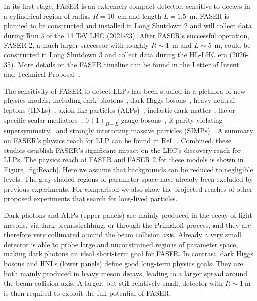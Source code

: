 In its first stage, FASER is an extremely compact detector, sensitive to decays in a cylindrical region of radius $R=10$~cm and length $L= 1.5$~m. FASER is planned to be constructed and installed in Long Shutdown 2 and will collect data during Run 3 of the 14 TeV LHC (2021-23). After FASER's successful operation, FASER 2, a much larger successor with roughly $R\sim1$~m and $L\sim5$~m, could be constructed in Long Shutdown 3 and collect data during the HL-LHC era (2026-35). More details on the FASER timeline can be found in the Letter of Intent~\cite{Ariga:2018zuc} and Technical Proposal~\cite{Ariga:2018pin}.
 
The sensitivity of FASER to detect LLPs has been studied in a plethora of new physics models, including dark photons~\cite{Feng:2017uoz}, dark Higgs bosons~\cite{Feng:2017vli}, heavy neutral leptons (HNLs)~\cite{Kling:2018wct}, axion-like particles (ALPs)~\cite{Feng:2018pew}, inelastic dark matter~\cite{Berlin:2018jbm},
flavor-specific scalar mediators~\cite{Batell:2017kty}, $U(1)_{B-L}$-gauge bosons~\cite{Bauer:2018onh}, R-parity violating supersymmetry~\cite{Helo:2018qej,Dercks:2018eua} and strongly interacting massive particles (SIMPs)~\cite{Hochberg:2018rjs}. A summary on FASER's physics reach for LLP can be found in Ref.~\cite{Ariga:2018uku}. Combined, these studies establish FASER's significant impact on the LHC's discovery reach for LLPs. The physics reach at FASER and FASER 2 for these models is shown in Figure~\ref{fig:Reach}. Here we assume that backgrounds can be reduced to negligible levels. The gray-shaded regions of parameter space have already been excluded by previous experiments. For comparison we also show the projected reaches of other proposed experiments that search for long-lived particles. 

Dark photons and ALPs (upper panels) are mainly produced in the decay of light mesons, via dark bremsstrahlung, or through the Primakoff process, and they are therefore very collimated around the beam collision axis. Already a very small detector is able to probe large and unconstrained regions of parameter space, making dark photons an ideal short-term goal for FASER. In contrast, dark Higgs bosons and HNLs (lower panels) define good long-term physics goals. They are both mainly produced in heavy meson decays, leading to a larger spread around the beam collision axis. A larger, but still relatively small, detector with $R\sim 1~\text{m}$ is then required to exploit the full potential of FASER. 



\newpage
\clearpage


